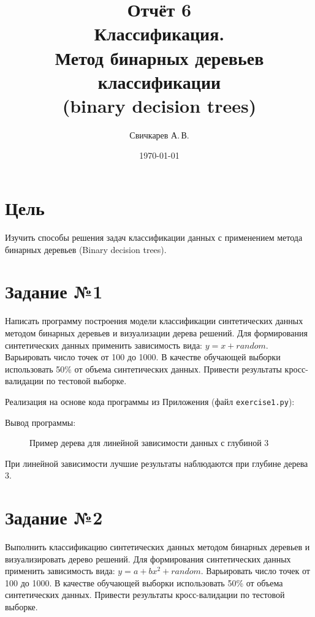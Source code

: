 \documentclass{article} %
\title{Отчёт 6\protect\\
    Классификация.\\
    Метод бинарных деревьев классификации\\
    (binary decision trees)} %
\author{Свичкарев А.\,В.} %
\date{\today} %
\begin{document}

\maketitle %

\section{Цель}
Изучить способы решения задач классификации данных с
применением метода бинарных деревьев (Binary decision trees).

\section{Задание №1}
Написать программу построения модели классификации синтетических данных
методом бинарных деревьев и визуализации дерева решений. Для формирования
синтетических данных применить зависимость вида: $y = x + random$. Варьировать число
точек от 100 до 1000. В качестве обучающей выборки использовать 50\% от объема
синтетических данных. Привести результаты кросс-валидации по тестовой выборке.
\bigskip

Реализация на основе кода программы из Приложения (файл \verb$exercise1.py$):
\bigskip

Вывод программы:

\bigskip

\begin{figure}[H]
    \centering
    \noindent{}
    \caption{Пример дерева для линейной зависимости данных с глубиной 3}
\end{figure}
\bigskip

При линейной зависимости лучшие результаты
наблюдаются при глубине дерева 3.

\clearpage
\section{Задание №2}
Выполнить классификацию синтетических данных методом бинарных деревьев и
визуализировать дерево решений. Для формирования синтетических данных применить
зависимость вида: $y = a+b x^2 + random$. Варьировать число точек от 100 до 1000. В
качестве обучающей выборки использовать 50\% от объема синтетических данных.
Привести результаты кросс-валидации по тестовой выборке.
\bigskip
\end{document}
